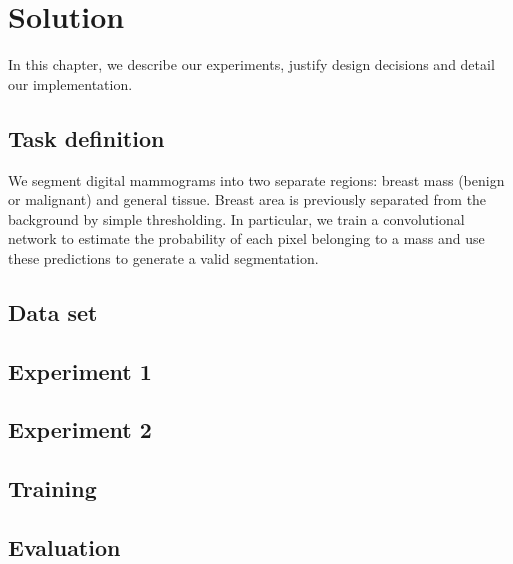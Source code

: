 \chapter{Solution}
\label{ch:Model}

In this chapter, we describe our experiments, justify design decisions and detail our implementation.


\section{Task definition}
We segment digital mammograms into two separate regions: breast mass (benign or malignant) and general tissue.
Breast area is previously separated from the background by simple thresholding.
In particular, we train a convolutional network to estimate the probability of each pixel belonging to a mass and use these predictions to generate a valid segmentation.

\section{Data set}


\section{Experiment 1}


\section{Experiment 2}


\begin{comment}
\section{Experiment 3}
We use a different netwrok architecture and insights gained from previous experiments to improve our results. 

\subsection{Architecture}
An architecture modelled on the ResNet~\cite{}, winner of the 2015 ImageNet competition is also used for experiments (Tab~\cite{}).
\end{comment}

\section{Training}


\section{Evaluation}


